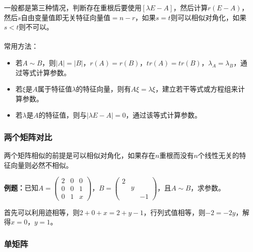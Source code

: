 一般都是第三种情况，判断存在重根后要使用$[\lambda E-A]$，然后计算$r(E-A)$，然后$s$自由变量值即无关特征向量值$=n-r$，如果$s=t$则可以相似对角化，如果$s<t$则不可以。

\paragraph{}

常用方法：

\begin{itemize}
    \item 若$A\sim B$，则$\vert A\vert=\vert B\vert$，$r(A)=r(B)$，$tr(A)=tr(B)$，$\lambda_A=\lambda_B$，通过等式计算参数。
    \item 若$\xi$是$A$属于特征值$\lambda$的特征向量，则有$A\xi=\lambda\xi$，建立若干等式或方程组来计算参数。
    \item 若$\lambda$是$A$的特征值，则与$\vert\lambda E-A\vert=0$，通过该等式计算参数。
\end{itemize}

\subsubsection{两个矩阵对比}

两个矩阵相似的前提是可以相似对角化，如果存在$n$重根而没有$n$个线性无关的特征向量则必然不相似。

\textbf{例题：}已知$A=\left(\begin{array}{ccc}
    2 & 0 & 0 \\
    0 & 0 & 1 \\
    0 & 1 & x
\end{array}\right)$，$B=\left(\begin{array}{ccc}
    2 \\
     & y \\
     & & -1
\end{array}\right)$，且$A\sim B$，求参数。\medskip

首先可以利用迹相等，则$2+0+x=2+y-1$，行列式值相等，则$-2=-2y$，解得$x=0$，$y=1$。

\subsubsection{单矩阵}


